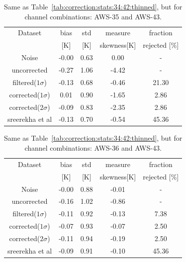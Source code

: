 \documentclass[12pt]{article}
\begin{document}
\begin{table}[!bt]
	\centering
	\begin{tabular}[b]{c|c|c|c|c}
		Dataset  		  &   bias &   std &   measure & fraction \\
							&   [K]  &   [K] & skewness[K] & rejected [\%]\\
		\hline
 Noise           	  &  -0.00 &  0.63 &               0.00 &                -\\
uncorrected     	  &  -0.27 &  1.06 &              -4.42 &                - \\
filtered($1\sigma$)	  &  -0.13 &  0.68 &              -0.46 &               21.30 \\
corrected($1\sigma$)  &   0.01 &  0.90 &              -1.65 &                2.86 \\
corrected($2\sigma$)  &  -0.09 &  0.83 &              -2.35 &                2.86 \\
sreerekha et al  	  &  -0.13 &  0.70 &              -0.54 &               45.36 \\
		\hline
	\end{tabular}
	\caption{Same as Table~\ref{tab:correction:stats:34:42:thinned}, but for channel combinations: AWS-35 and AWS-43.   }
	\label{tab:correction:stats:35:43}
\end{table}

\begin{table}[!bt]
	\centering
	\begin{tabular}[b]{c|c|c|c|c}
		Dataset  		  &   bias &   std &   measure & fraction  \\
							&   [K]  &   [K] & skewness[K] & rejected [\%]\\
		\hline
 Noise            	 &  -0.00 &  0.88 &              -0.01 &               - \\
uncorrected      	 &  -0.16 &  1.02 &              -0.86 &                - \\
filtered($1\sigma$)  &  -0.11 &  0.92 &              -0.13 &                7.38 \\
corrected($1\sigma$) &  -0.07 &  0.93 &              -0.07 &                2.50 \\
corrected($2\sigma$) &  -0.11 &  0.94 &              -0.19 &                2.50 \\
sreerekha et al 	 &  -0.09 &  0.91 &              -0.10 &               45.36 \\
		\hline
	\end{tabular}
	\caption{Same as Table~\ref{tab:correction:stats:34:42:thinned}, but for channel combinations: AWS-36 and AWS-43.   }
	\label{tab:correction:stats:36:43}
\end{table}
\end{document}
